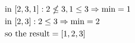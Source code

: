 \documentclass[preview]{standalone}
\begin{document}
\begin{align*}
\special{dvisvgm:raw <g id='unique000'>}\begin{aligned}&\text{in } [2, 3, 1]: 2 \nleq 3, 1 \le 3 \Rightarrow \text{min} = 1\\&\text{in } [2, 3]: 2 \le 3 \Rightarrow \text{min} = 2\\&\text{so the result} = [1, 2, 3]\end{aligned}\special{dvisvgm:raw </g>}
\end{align*}
\end{document}
